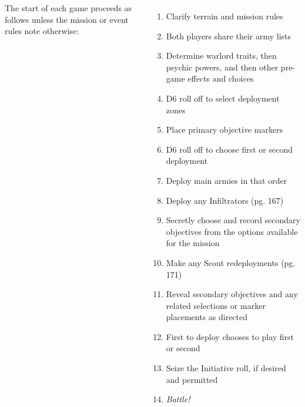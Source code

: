 \clearpage
{}

\begin{columns}
  

The start of each game proceeds as follows unless the mission or event
rules note otherwise:

\begin{enumerate}\shortlist
\item Clarify terrain and mission rules

\item Both players share their army lists

\item Determine warlord traits, then psychic powers, and then other
  pre-game effects and choices

\item D6 roll off to select deployment zones

\item Place primary objective markers

\item D6 roll off to choose first or second deployment

\item Deploy main armies in that order

\item Deploy any Infiltrators (pg. 167)

\item Secretly choose and record secondary objectives from the options
  available for the mission

\item Make any Scout redeployments (pg. 171)

\item Reveal secondary objectives and any related selections or marker
  placements as directed

\item First to deploy chooses to play first or second

\item Seize the Initiative roll, if desired and permitted

\item \emph{Battle!}
\end{enumerate}


\end{columns}
